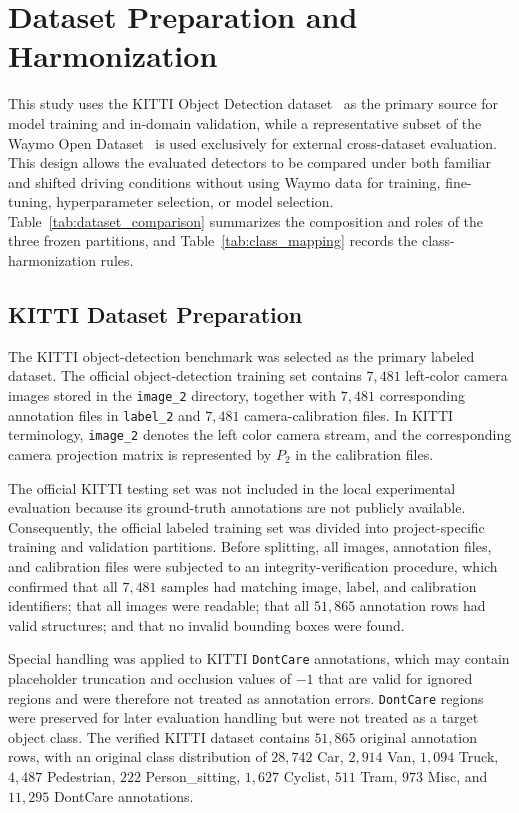 \section{Dataset Preparation and Harmonization}
\label{sec:datasets}

This study uses the KITTI Object Detection dataset~\cite{geiger2012kitti} as the primary
source for model training and in-domain validation, while a representative subset of the
Waymo Open Dataset~\cite{sun2020waymo} is used exclusively for external cross-dataset
evaluation. This design allows the evaluated detectors to be compared under both familiar
and shifted driving conditions without using Waymo data for training, fine-tuning,
hyperparameter selection, or model selection. Table~\ref{tab:dataset_comparison}
summarizes the composition and roles of the three frozen partitions, and
Table~\ref{tab:class_mapping} records the class-harmonization rules.




\subsection{KITTI Dataset Preparation}
\label{sec:datasets_kitti}

The KITTI object-detection benchmark was selected as the primary labeled dataset. The
official object-detection training set contains $7{,}481$ left-color camera images stored
in the \texttt{image\_2} directory, together with $7{,}481$ corresponding annotation files
in \texttt{label\_2} and $7{,}481$ camera-calibration files. In KITTI terminology,
\texttt{image\_2} denotes the left color camera stream, and the corresponding camera
projection matrix is represented by $P_2$ in the calibration files.

The official KITTI testing set was not included in the local experimental evaluation
because its ground-truth annotations are not publicly available. Consequently, the
official labeled training set was divided into project-specific training and validation
partitions. Before splitting, all images, annotation files, and calibration files were
subjected to an integrity-verification procedure, which confirmed that all $7{,}481$
samples had matching image, label, and calibration identifiers; that all images were
readable; that all $51{,}865$ annotation rows had valid structures; and that no invalid
bounding boxes were found.

Special handling was applied to KITTI \texttt{DontCare} annotations, which may contain
placeholder truncation and occlusion values of $-1$ that are valid for ignored regions and
were therefore not treated as annotation errors. \texttt{DontCare} regions were preserved
for later evaluation handling but were not treated as a target object class. The verified
KITTI dataset contains $51{,}865$ original annotation rows, with an original class
distribution of $28{,}742$ Car, $2{,}914$ Van, $1{,}094$ Truck, $4{,}487$ Pedestrian,
$222$ Person\_sitting, $1{,}627$ Cyclist, $511$ Tram, $973$ Misc, and $11{,}295$
DontCare annotations.

